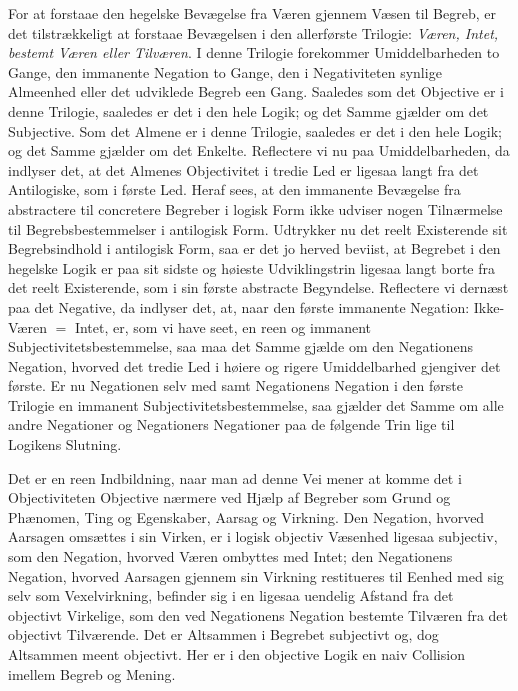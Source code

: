 \documentclass[12pt]{book}
\newcommand{\opage}[1]{\marginnote{\footnotesize\textit{[#1]}}}
\begin{document}
For at forstaae den hegelske Bevægelse fra Væren gjennem Væsen til Begreb, er det
tilstrækkeligt at forstaae Bevægelsen i den allerførste Trilogie: \emph{Væren, Intet, bestemt
Væren eller Tilværen}. I denne Trilogie forekommer Umiddelbarheden to Gange, den immanente
Negation to Gange, den i Negativiteten synlige Almeenhed eller det udviklede Begreb een Gang.
Saaledes som det Objective er i denne Trilogie, saaledes er det i den hele Logik; og det Samme
gjælder om det Subjective. Som det Almene er i denne Trilogie, saaledes er det i den hele
Logik; og det Samme gjælder om det Enkelte. Reflectere vi nu paa Umiddelbarheden, da indlyser
det, at det Almenes Objectivitet i tredie Led er ligesaa langt fra det Antilogiske, som i
første Led. Heraf sees, at den immanente Bevægelse fra abstractere til concretere Begreber i
logisk Form ikke udviser nogen Tilnærmelse til Begrebsbestemmelser i antilogisk Form.
Udtrykker nu det reelt Existerende sit Begrebsindhold i antilogisk Form, saa er det jo herved
beviist, at Begrebet i den hegelske Logik er paa sit sidste og høieste Udviklingstrin ligesaa
langt borte fra det reelt Existerende, som i sin første abstracte Begyndelse. Reflectere vi
dernæst paa det Negative, da indlyser det, at, naar den første immanente Negation:
Ikke-Væren $=$ Intet, er, som vi have seet, en reen og immanent Subjectivitetsbestemmelse, saa
maa det Samme gjælde om den Negationens Negation, hvorved det tredie Led i høiere og rigere
Umiddelbarhed gjengiver det første. Er nu Negationen selv med samt Negationens Negation i den
første Trilogie en immanent Subjectivitetsbestemmelse, saa gjælder det Samme om alle andre
\opage{153} Negationer og Negationers Negationer paa de følgende Trin lige til Logikens Slutning.

Det er en reen Indbildning, naar man ad denne Vei mener at komme det i Objectiviteten
Objective nærmere ved Hjælp af Begreber som Grund og Phænomen, Ting og Egenskaber, Aarsag og
Virkning. Den Negation, hvorved Aarsagen omsættes i sin Virken, er i logisk objectiv Væsenhed
ligesaa subjectiv, som den Negation, hvorved Væren ombyttes med Intet; den Negationens
Negation, hvorved Aarsagen gjennem sin Virkning restitueres til Eenhed med sig selv som
Vexelvirkning, befinder sig i en ligesaa uendelig Afstand fra det objectivt Virkelige, som den
ved Negationens Negation bestemte Tilværen fra det objectivt Tilværende. Det er Altsammen i
Begrebet subjectivt og, dog Altsammen meent objectivt. Her er i den objective Logik en naiv
Collision imellem Begreb og Mening.
\end{document}
